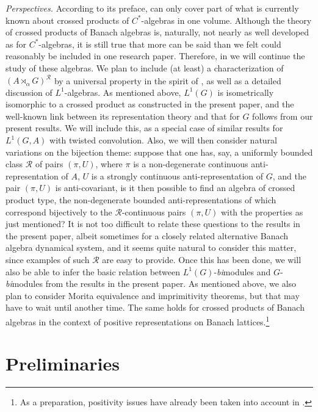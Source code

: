 \documentclass{amsart}
\theoremstyle{plain}
\theoremstyle{definition}
\numberwithin{equation}{section}
\begin{document}
\medskip
\emph{Perspectives.} According to its preface, \cite{williams} can only cover part of what is currently known about crossed products of $C^*$-algebras in one volume. Although the theory of crossed products of Banach algebras is, naturally, not nearly as well developed as for $C^*$-algebras, it is still true that more can be said than we felt could reasonably be included in one research paper. Therefore, in \cite{crossedtwo} we will continue the study of these algebras. We plan to include (at least) a characterization of ${(A {\rtimes}_\alpha G)^\mathcal{R}}$ by a universal property in the spirit of \cite[Theorem~2.61]{williams}, as well as a detailed discussion of $L^1$-algebras. As mentioned above, $L^1(G)$ is isometrically isomorphic to a crossed product as constructed in the present paper, and the well-known link between its representation theory and that for $G$ follows from our present results. We will include this, as a special case of similar results for $L^1(G,A)$ with twisted convolution. Also, we will then consider natural variations on the bijection theme: suppose that one has, say, a uniformly bounded class ${\mathcal R}$ of pairs ${(\pi,U)}$, where $\pi$ is a non-degenerate continuous anti-representation of $A$, $U$ is a strongly continuous anti-representation of $G$, and the pair ${(\pi,U)}$ is anti-covariant, is it then possible to find an algebra of crossed product type, the non-degenerate bounded anti-representations of which correspond bijectively to the ${\mathcal R}$-continuous pairs ${(\pi,U)}$ with the properties as just mentioned? It is not too difficult to relate these questions to the results in the present paper, albeit sometimes for a closely related alternative Banach algebra dynamical system, and it seems quite natural to consider this matter, since examples of such ${\mathcal R}$ are easy to provide. Once this has been done, we will also be able to infer the basic relation \cite[Proposition~2.1]{johnson} between $L^1(G)$-\emph{bi}modules and $G$-\emph{bi}modules from the results in the present paper. As mentioned above, we also plan to consider Morita equivalence and imprimitivity theorems, but that may have to wait until another time. The same holds for crossed products of Banach algebras in the context of positive representations on Banach lattices.\footnote{As a preparation, positivity issues have already been taken into account in \cite{extendart}.}

\section{Preliminaries}\label{sec:preliminaries}
\end{document}
